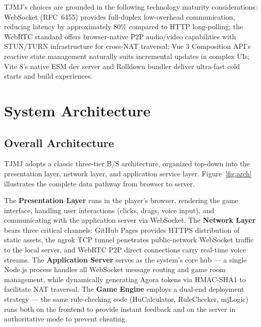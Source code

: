 \documentclass[11pt,a4paper]{article}
\begin{document}
TJMJ's choices are grounded in the following technology maturity considerations: WebSocket (RFC~6455) provides full-duplex low-overhead communication, reducing latency by approximately 80\% compared to HTTP long-polling; the WebRTC standard offers browser-native P2P audio/video capabilities with STUN/TURN infrastructure for cross-NAT traversal; Vue 3 Composition API's reactive state management naturally suits incremental updates in complex UIs; Vite 8's native ESM dev server and Rolldown bundler deliver ultra-fast cold starts and build experiences.

\newpage
\section{System Architecture}

\subsection{Overall Architecture}

TJMJ adopts a classic three-tier B/S architecture, organized top-down into the presentation layer, network layer, and application service layer. Figure~\ref{fig:arch} illustrates the complete data pathway from browser to server.

The \textbf{Presentation Layer} runs in the player's browser, rendering the game interface, handling user interactions (clicks, drags, voice input), and communicating with the application server via WebSocket. The \textbf{Network Layer} bears three critical channels: GitHub Pages provides HTTPS distribution of static assets, the ngrok TCP tunnel penetrates public-network WebSocket traffic to the local server, and WebRTC P2P direct connections carry real-time voice streams. The \textbf{Application Server} serves as the system's core hub — a single Node.js process handles all WebSocket message routing and game room management, while dynamically generating Agora tokens via HMAC-SHA1 to facilitate NAT traversal. The \textbf{Game Engine} employs a dual-end deployment strategy — the same rule-checking code (HuCalculator, RuleChecker, mjLogic) runs both on the frontend to provide instant feedback and on the server in authoritative mode to prevent cheating.
\end{document}
